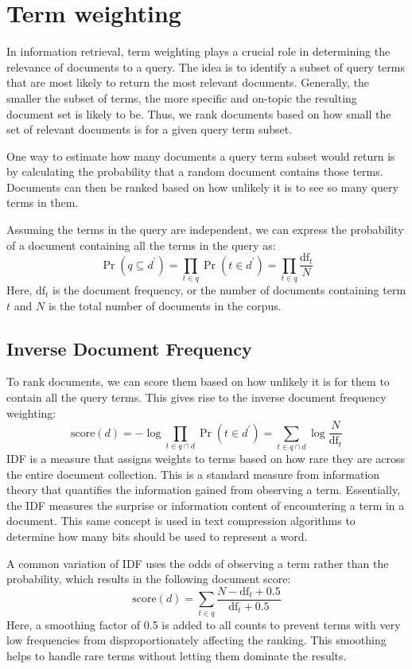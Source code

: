 \section{Term weighting}

In information retrieval, term weighting plays a crucial role in determining the relevance of documents to a query. 
The idea is to identify a subset of query terms that are most likely to return the most relevant documents.
Generally, the smaller the subset of terms, the more specific and on-topic the resulting document set is likely to be. 
Thus, we rank documents based on how small the set of relevant documents is for a given query term subset.

One way to estimate how many documents a query term subset would return is by calculating the probability that a random document contains those terms. 
Documents can then be ranked based on how unlikely it is to see so many query terms in them.

Assuming the terms in the query are independent, we can express the probability of a document containing all the terms in the query as:
\[\Pr(q\subseteq d^\prime)=\prod_{t\in q}\Pr(t\in d^\prime)=\prod_{t \in q}\dfrac{\text{df}_t}{N}\]
\noindent Here, $\text{df}_t$ is the document frequency, or the number of documents containing term $t$ and $N$ is the total number of documents in the corpus.

\subsection{Inverse Document Frequency}
To rank documents, we can score them based on how unlikely it is for them to contain all the query terms. 
This gives rise to the inverse document frequency weighting:
\[\text{score}(d)=-\log\prod_{t\in q\cap d}\Pr(t\in d^\prime)=\sum_{t \in q\cap d}\log\dfrac{N}{\text{df}_t}\]
\noindent IDF is a measure that assigns weights to terms based on how rare they are across the entire document collection. 
This is a standard measure from information theory that quantifies the information gained from observing a term. 
Essentially, the IDF measures the surprise or information content of encountering a term in a document. 
This same concept is used in text compression algorithms to determine how many bits should be used to represent a word.

A common variation of IDF uses the odds of observing a term rather than the probability, which results in the following document score:
\[\text{score}(d)=\sum_{t\in q}\dfrac{N-\text{df}_t+0.5}{\text{df}_t+0.5}\]
Here, a smoothing factor of 0.5 is added to all counts to prevent terms with very low frequencies from disproportionately affecting the ranking. 
This smoothing helps to handle rare terms without letting them dominate the results.

